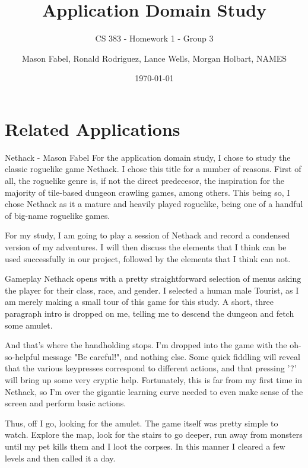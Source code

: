 \documentclass[12pt]{report}
\title{Application Domain Study}
\subtitle{CS 383 - Homework 1 - Group 3}
\author{Mason Fabel, Ronald Rodriguez, Lance Wells, Morgan Holbart, NAMES} %
\date{\today}
\begin{document}
\maketitle

\chapter{Related Applications}


\begin{section}{Nethack - Mason Fabel}
For the application domain study, I chose to study the classic roguelike
game Nethack. I chose this title for a number of reasons. First of all,
the roguelike genre is, if not the direct predecesor, the inspiration for
the majority of tile-based dungeon crawling games, among others. This being
so, I chose Nethack as it a mature and heavily played roguelike, being one
of a handful of big-name roguelike games.

For my study, I am going to play a session of Nethack and record a
condensed version of my adventures. I will then discuss the elements that
I think can be used successfully in our project, followed by the elements
that I think can not.

\begin{subsection}{Gameplay}
Nethack opens with a pretty straightforward selection of menus asking the
player for their class, race, and gender. I selected a human male Tourist,
as I am merely making a small tour of this game for this study. A short,
three paragraph intro is dropped on me, telling me to descend the
dungeon and fetch some amulet.

And that's where the handholding stops. I'm dropped into the game with the
oh-so-helpful message "Be careful!", and nothing else. Some quick fiddling
will reveal that the various keypresses correspond to different actions,
and that pressing '?' will bring up some very cryptic help. Fortunately,
this is far from my first time in Nethack, so I'm over the gigantic
learning curve needed to even make sense of the screen and perform basic
actions.

Thus, off I go, looking for the amulet. The game itself was pretty simple
to watch. Explore the map, look for the stairs to go deeper, run away from
monsters until my pet kills them and I loot the corpses. In this manner I
cleared a few levels and then called it a day.
\end{subsection}


\end{section}
\end{document}
